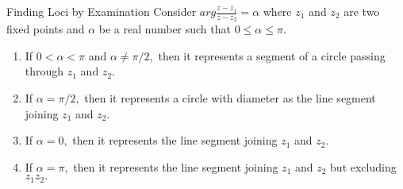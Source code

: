 \documentclass[aspectratio=169,8pt]{beamer}
\begin{document}
\begin{frame}{Finding Loci by Examination}
  Consider $arg\frac{z - z_1}{z - z_2} = \alpha$ where $z_1$ and $z_2$ are two fixed points and $\alpha$ be a real number such that
  $0\leq \alpha \leq \pi.$
  \begin{enumerate}
  \item If $0 < \alpha < \pi$ and $\alpha\neq \pi/2,$ then it represents a segment of a circle passing through $z_1$ and $z_2.$
  \item If $\alpha = \pi/2,$ then it represents a circle with diameter as the line segment joining $z_1$ and $z_2.$
  \item If $\alpha = 0,$ then it represents the line segment joining $z_1$ and $z_2.$
  \item If $\alpha = \pi,$ then it represents the line segment joining $z_1$ and $z_2$ but excluding $z_1z_2.$
  \end{enumerate}
\end{frame}
\end{document}
